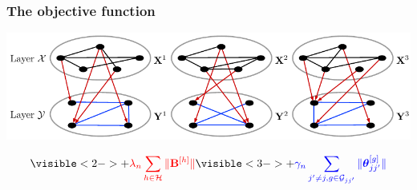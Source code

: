 \documentclass[10pt]{beamer}
\theoremstyle{definition}
\DeclareMathOperator*{\Tr}{Tr}
\DeclareMathOperator*{\argmin}{argmin}
\begin{document}
\begin{frame}
\frametitle{The objective function}

\begin{center}
\includegraphics[width=.9\textwidth]{multitwolayer}
\end{center}


$$
\visible<2->{ + {\colr \lambda_n \sum_{h \in \cH} \| \bfB^{[h]} \|}}
\visible<3->{ + {\colb \gamma_n \sum_{j' \neq j, g \in \cG_{jj'}} \| \bftheta_{jj'}^{[g]} \|}}
$$
\end{frame}
%
%
%
%
%
%
\end{document}
